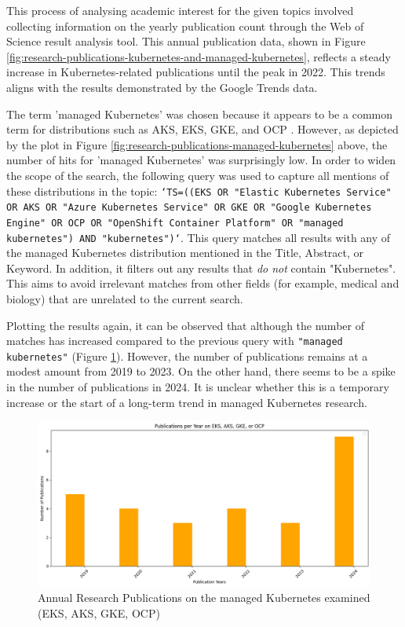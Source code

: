 This process of analysing academic interest for the given topics involved collecting information on the yearly publication count through the Web of Science result analysis tool. This annual publication data, shown in Figure \ref{fig:research-publications-kubernetes-and-managed-kubernetes}, reflects a steady increase in Kubernetes-related publications until the peak in 2022. This trends aligns with the results demonstrated by the Google Trends data.

The term 'managed Kubernetes' was chosen because it appears to be a common term for distributions such as AKS, EKS, GKE, and OCP \cite{AmazonEKSCustomers,ManagedKubernetesService,pereiraferreiraPerformanceEvaluationContainers2019}. However, as depicted by the plot in Figure \ref{fig:research-publications-managed-kubernetes} above, the number of hits for 'managed Kubernetes' was surprisingly low. In order to widen the scope of the search, the following query was used to capture all mentions of these distributions in the topic: \texttt{`TS=((EKS OR "Elastic Kubernetes Service" OR AKS OR "Azure Kubernetes Service" OR GKE OR "Google Kubernetes Engine" OR OCP OR "OpenShift Container Platform" OR "managed kubernetes") AND "kubernetes")`}. This query matches all results with any of the managed Kubernetes distribution mentioned in the Title, Abstract, or Keyword. In addition, it filters out any results that \textit{do not} contain "Kubernetes". This aims to avoid irrelevant matches from other fields (for example, medical and biology) that are unrelated to the current search.

Plotting the results again, it can be observed that although the number of matches has increased compared to the previous query with \texttt{"managed kubernetes"} (Figure \ref{fig:managed-k8s-broaden-scope}). However, the number of publications remains at a modest amount from 2019 to 2023. On the other hand, there seems to be a spike in the number of publications in 2024. It is unclear whether this is a temporary increase or the start of a long-term trend in managed Kubernetes research.

\FloatBarrier


\begin{figure}
    \centering
    \includegraphics[width=1\linewidth]{resources/managed-k8s-broaden-scope.png}
    \caption{Annual Research Publications on the managed Kubernetes examined (EKS, AKS, GKE, OCP)}
    \label{fig:managed-k8s-broaden-scope}
\end{figure}


